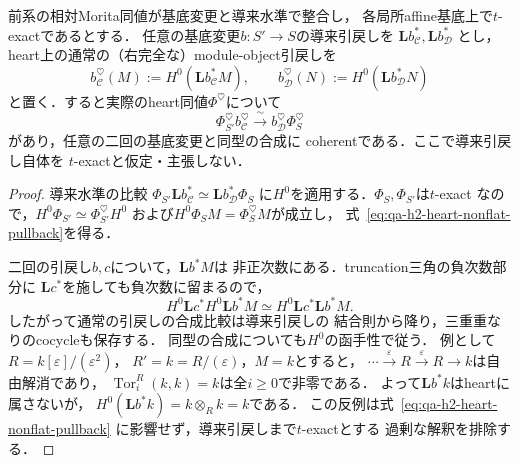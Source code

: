 \begin{lemma}[非平坦基底変更におけるheartの零次比較]
\label{lem:qa-h2-heart-underived-base-change}
前系の相対Morita同値が基底変更と導来水準で整合し，
各局所affine基底上で$t$-exactであるとする．
任意の基底変更$b:S'\to S$の導来引戻しを
$\mathbf Lb_{\mathcal C}^*,\mathbf Lb_{\mathcal D}^*$
とし，heart上の通常の（右完全な）module-object引戻しを
\[
 b_{\mathcal C}^{\heartsuit}(M)
 :=H^0(\mathbf Lb_{\mathcal C}^*M),\qquad
 b_{\mathcal D}^{\heartsuit}(N)
 :=H^0(\mathbf Lb_{\mathcal D}^*N)
\]
と置く．すると実際のheart同値$\Phi^\heartsuit$について
\[
 \Phi_{S'}^\heartsuit b_{\mathcal C}^{\heartsuit}
 \xrightarrow{\ \sim\ }
 b_{\mathcal D}^{\heartsuit}\Phi_S^\heartsuit
 \tag{HB}\label{eq:qa-h2-heart-nonflat-pullback}
\]
があり，任意の二回の基底変更と同型の合成に
coherentである．ここで導来引戻し自体を
$t$-exactと仮定・主張しない．
\end{lemma}
\begin{proof}
導来水準の比較
$\Phi_{S'}\mathbf Lb_{\mathcal C}^*
 \simeq\mathbf Lb_{\mathcal D}^*\Phi_S$
に$H^0$を適用する．$\Phi_S,\Phi_{S'}$は$t$-exact
なので，$H^0\Phi_{S'}\simeq\Phi_{S'}^\heartsuit H^0$
および$H^0\Phi_SM=\Phi_S^\heartsuit M$が成立し，
式~\eqref{eq:qa-h2-heart-nonflat-pullback}を得る．

二回の引戻し$b,c$について，$\mathbf Lb^*M$は
非正次数にある．truncation三角の負次数部分に
$\mathbf Lc^*$を施しても負次数に留まるので，
\[
 H^0\mathbf Lc^* H^0\mathbf Lb^*M
 \simeq H^0\mathbf Lc^*\mathbf Lb^*M.
\]
したがって通常の引戻しの合成比較は導来引戻しの
結合則から降り，三重重なりのcocycleも保存する．
同型の合成についても$H^0$の函手性で従う．
例として$R=k[\varepsilon]/(\varepsilon^2)$，
$R'=k=R/(\varepsilon)$，$M=k$とすると，
$\cdots\xrightarrow{\varepsilon}R
\xrightarrow{\varepsilon}R\to k$は自由解消であり，
$\operatorname{Tor}^R_i(k,k)=k$は全$i\ge0$で非零である．
よって$\mathbf Lb^*k$はheartに属さないが，
$H^0(\mathbf Lb^*k)=k\otimes_Rk=k$である．
この反例は式~\eqref{eq:qa-h2-heart-nonflat-pullback}
に影響せず，導来引戻しまで$t$-exactとする
過剰な解釈を排除する．
\end{proof}

